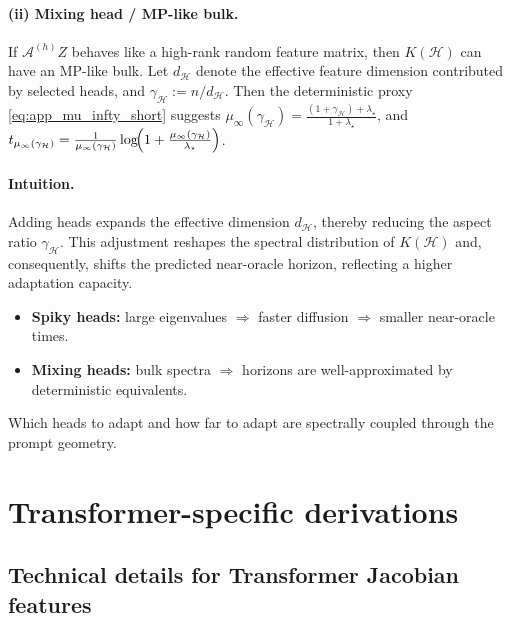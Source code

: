 \documentclass{article}
\theoremstyle{plain}
\theoremstyle{definition}
\theoremstyle{remark}
\begin{document}
\paragraph{(ii) Mixing head / MP-like bulk.}
If $\mathcal{A}^{(h)}Z$ behaves like a high-rank random feature matrix, then $K(\mathcal{H})$ can have an MP-like bulk.
Let $d_{\mathcal{H}}$ denote the effective feature dimension contributed by selected heads, and $\gamma_{\mathcal{H}}:=n/d_{\mathcal{H}}$.
Then the deterministic proxy \eqref{eq:app_mu_infty_short} suggests
$\mu_\infty(\gamma_{\mathcal{H}})=\frac{(1+\gamma_{\mathcal{H}})+\lambda_\star}{1+\lambda_\star}$, and $t_{\mu_\infty(\gamma_{\mathcal{H}})}=\frac{1}{\mu_\infty(\gamma_{\mathcal{H}})}\log\!\Bigl(1+\frac{\mu_\infty(\gamma_{\mathcal{H}})}{\lambda_\star}\Bigr)$.

\paragraph{Intuition.}
Adding heads expands the effective dimension $d_{\mathcal H}$, thereby reducing the aspect ratio $\gamma_{\mathcal H}$. This adjustment reshapes the spectral distribution of $K(\mathcal H)$ and, consequently, shifts the predicted near-oracle horizon, reflecting a higher adaptation capacity.

\begin{takeawaybox}[title=\textbf{Summary: spectrum couples how far and {which heads} to adapt}]
\begin{itemize}[leftmargin=*, itemsep=0pt, topsep=0pt]
\item \textbf{Spiky heads:} large eigenvalues $\Rightarrow$ faster diffusion $\Rightarrow$ smaller near-oracle times.
\item \textbf{Mixing heads:} bulk spectra $\Rightarrow$ horizons are well-approximated by deterministic equivalents.
\end{itemize}
\noindent
Which heads to adapt and how far to adapt are spectrally coupled through the prompt geometry.
\end{takeawaybox}




\section{Transformer-specific derivations}

\subsection{Technical details for Transformer Jacobian features}
\label{app:transformer_geometry_details}
\end{document}
